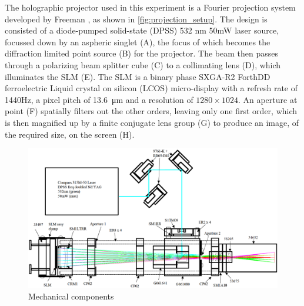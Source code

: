 The holographic projector used in this experiment is a Fourier projection system developed by Freeman \cite{Freeman2009}, as shown in \cref{fig:projection_setup}. The design is consisted of a diode-pumped solid-state (DPSS) 532 nm 50mW laser source, focussed down by an aspheric singlet (A), the focus of which becomes the diffraction limited point source (B) for the projector. The beam then passes through a polarizing beam splitter cube (C) to a collimating lens (D), which illuminates the SLM (E). The SLM is a binary phase SXGA-R2 ForthDD ferroelectric Liquid crystal on silicon (LCOS) micro-display with a refresh rate of 1440Hz, a pixel pitch of \SI{13.6}{\micro\metre} and a resolution of $1280\times1024$. An aperture at point (F) spatially filters out the other orders, leaving only one first order, which is then magnified up by a finite conjugate lens group (G) to produce an image, of the required size, on the screen (H). \cite{Freeman2009}

\begin{figure}[H]
    \centering
    \includegraphics[width=\textwidth]{holographic_projector.png}
    \caption{Mechanical components \cite{Freeman2009}}
    \label{fig:holographic_projector}
\end{figure}

